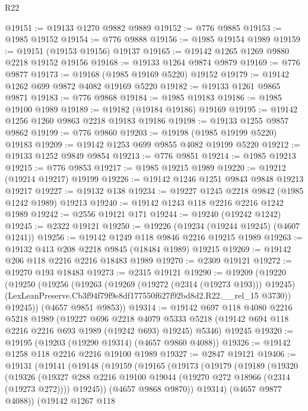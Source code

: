 \begin{lexlean}{R22}
\begin{coremodule}
@19151 := @19133 @1270 @9882 @9889
@19152 := @776 @9885
@19153 := @1985 @19152
@19154 := @776 @9888
@19156 := @1985 @19154 @1989
@19159 := @19151 (@19153 @19156) @19137
@19165 := @19142 @1265 @1269 @9880 @2218 @19152 @19156
@19168 := @19133 @1264 @9874 @9879
@19169 := @776 @9877
@19173 := @19168 (@1985 @19169 @5220) @19152
@19179 := @19142 @1262 @699 @9872 @4082 @19169 @5220
@19182 := @19133 @1261 @9865 @9871
@19183 := @776 @9868
@19184 := @1985 @19183
@19186 := @1985 @19100 @1989
@19189 := @19182 (@19184 @19186) @19169
@19195 := @19142 @1256 @1260 @9863 @2218 @19183 @19186
@19198 := @19133 @1255 @9857 @9862
@19199 := @776 @9860
@19203 := @19198 (@1985 @19199 @5220) @19183
@19209 := @19142 @1253 @699 @9855 @4082 @19199 @5220
@19212 := @19133 @1252 @9849 @9854
@19213 := @776 @9851
@19214 := @1985 @19213
@19215 := @776 @9853
@19217 := @1985 @19215 @1989
@19220 := @19212 (@19214 @19217) @19199
@19226 := @19142 @1246 @1251 @9843 @9848 @19213 @19217
@19227 := @19132 @138
@19234 := @19227 @1245 @2218 @9842 (@1985 @1242 @1989) @19213
@19240 := @19142 @1243 @118 @2216 @2216 @1242 @1989
@19242 := @2556 @19121 @171
@19244 := @19240 (@19242 @1242)
@19245 := @2322 @19121
@19250 := @19226 (@19234 (@19244 @19245) (@4607 @1241))
@19256 := @19142 @1249 @118 @9846 @2216 @19215 @1989
@19263 := @19132 @413 @208 @2218 @9845 (@18484 @1989) @19215
@19269 := @19142 @206 @118 @2216 @2216 @18483 @1989
@19270 := @2309 @19121
@19272 := @19270 @193 @18483
@19273 := @2315 @19121
@19290 := @19209
    (@19220
      (@19250
        (@19256
          (@19263
            (@19269 (@19272 (@2314 (@19273 @193))) @19245)
            (LexLeanPreserve.Cb3f94f79f9e8df177550f627f92bd8d2.R22.__rel_15 @3730))
          @19245))
      (@4657 @9851 @9853))
@19314 := @19142
    @697
    @118
    @4080
    @2216
    @5218
    @1989
    (@19227
      @696
      @2218
      @4079
      @5333
      @5218
      (@19142 @694 @118 @2216 @2216 @693 @1989 (@19242 @693) @19245)
      @5346)
    @19245
@19320 := @19195 (@19203 (@19290 @19314) (@4657 @9860 @4088))
@19326 := @19142 @1258 @118 @2216 @2216 @19100 @1989
@19327 := @2847 @19121
@19406 := @19131
    (@19141
      (@19148
        (@19159
          (@19165
            (@19173
              (@19179
                (@19189
                  (@19320
                    (@19326
                      (@19327 @288 @2216 @19100 @19044 (@19270 @272 @18966 (@2314 (@19273 @272))))
                      @19245))
                  (@4657 @9868 @9870))
                @19314)
              (@4657 @9877 @4088))
            (@19142
              @1267
              @118

\end{coremodule}
\end{lexlean}
